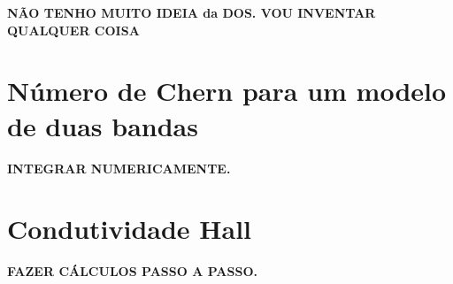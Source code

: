 \documentclass[a4paper,10pt]{article}
\begin{document}
\textbf{NÃO TENHO MUITO IDEIA da DOS. VOU INVENTAR QUALQUER COISA}

\pagebreak

\section{Número de Chern para um modelo de duas bandas}

\textbf{INTEGRAR NUMERICAMENTE.}

\pagebreak

\section{Condutividade Hall}

\textbf{FAZER CÁLCULOS PASSO A PASSO.}
\end{document}
